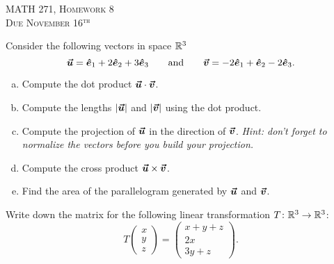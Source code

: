 \documentclass[12pt]{article} %
\newcommand{\ehat}{\boldsymbol{\hat{e}}}
\begin{document}
\begin{center}
   \textsc{\large MATH 271, Homework 8}\\
   \textsc{Due November 16$^\textrm{th}$}
\end{center}
\vspace{.5cm}


\begin{problem}
Consider the following vectors in space $\mathbb{R}^3$
\[
\vecu = \ehat_1 + 2\ehat_2 + 3\ehat_3 \qquad \textrm{and} \qquad \vecv = -2\ehat_1 +\ehat_2 -2\ehat_3.
\]
\begin{enumerate}[(a)]
    \item Compute the dot product $\boldsymbol{\vec{u}}\cdot \boldsymbol{\vec{v}}$.
    \item Compute the lengths $|\boldsymbol{\vec{u}}|$ and $|\boldsymbol{\vec{v}}|$ using the dot product.
    \item Compute the projection of $\boldsymbol{\vec{u}}$ in the direction of $\boldsymbol{\vec{v}}$.
    \emph{Hint: don't forget to normalize the vectors before you build your projection.}
    \item Compute the cross product $\boldsymbol{\vec{u}} \times \boldsymbol{\vec{v}}$.
    \item Find the area of the parallelogram generated by $\boldsymbol{\vec{u}}$ and $\boldsymbol{\vec{v}}$.
\end{enumerate}
\end{problem}
\vspace*{0.5cm}

\begin{problem}
Write down the matrix for the following linear transformation $T\colon \mathbb{R}^3 \to \mathbb{R}^3$:
\[
T\begin{pmatrix} x\\ y\\ z \end{pmatrix}
= \begin{pmatrix} x+y+z\\ 2x\\ 3y + z \end{pmatrix}.
\]
\end{problem}
\end{document}
